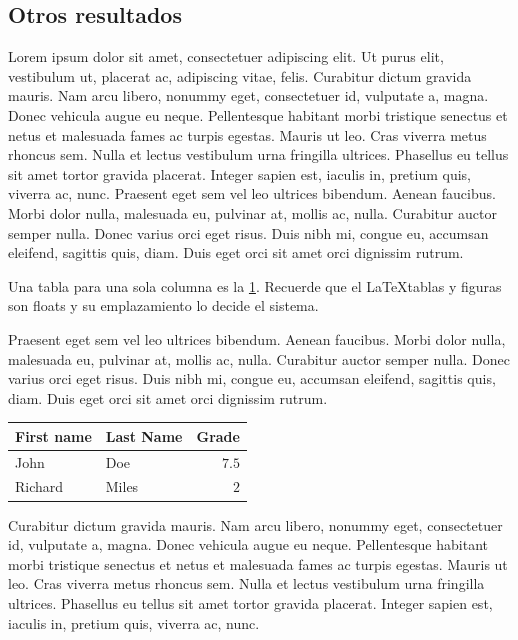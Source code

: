 \documentclass[10pt,twoside]{rcmart} %
\begin{document}
\subsection{Otros resultados}

Lorem ipsum dolor sit amet, consectetuer adipiscing elit. Ut purus elit, vestibulum ut, placerat ac, adipiscing vitae, felis. Curabitur dictum gravida mauris. Nam arcu libero, nonummy eget, consectetuer id, vulputate a, magna. Donec vehicula augue eu neque. Pellentesque habitant morbi tristique senectus et netus et malesuada fames ac turpis egestas. Mauris ut leo. Cras viverra metus rhoncus sem. Nulla et lectus vestibulum urna fringilla ultrices. Phasellus eu tellus sit amet tortor gravida placerat. Integer sapien est, iaculis in, pretium quis, viverra ac, nunc. Praesent eget sem vel leo ultrices bibendum. Aenean faucibus. Morbi dolor nulla, malesuada eu, pulvinar at, mollis ac, nulla. Curabitur auctor semper nulla. Donec varius orci eget risus. Duis nibh mi, congue eu, accumsan eleifend, sagittis quis, diam. Duis eget orci sit amet orci dignissim rutrum.

Una tabla para una sola columna es la \ref{tab:label}. Recuerde que el \LaTeX tablas y figuras son floats y su emplazamiento lo decide el sistema. 

Praesent eget sem vel leo ultrices bibendum. Aenean faucibus. Morbi dolor nulla, malesuada eu, pulvinar at, mollis ac, nulla. Curabitur auctor semper nulla. Donec varius orci eget risus. Duis nibh mi, congue eu, accumsan eleifend, sagittis quis, diam. Duis eget orci sit amet orci dignissim rutrum.

\begin{table}[hbt]
\begin{center}
\begin{tabular}{llr}\hline\hline
First name & Last Name & Grade \\\hline\hline
John & Doe & $7.5$ \\
Richard & Miles & $2$ \\\hline\hline
\end{tabular}
\end{center}
\label{tab:label}
\end{table}

Curabitur dictum gravida mauris. Nam arcu libero, nonummy eget, consectetuer id, vulputate a, magna. Donec vehicula augue eu neque. Pellentesque habitant morbi tristique senectus et netus et malesuada fames ac turpis egestas. Mauris ut leo. Cras viverra metus rhoncus sem. Nulla et lectus vestibulum urna fringilla ultrices. Phasellus eu tellus sit amet tortor gravida placerat. Integer sapien est, iaculis in, pretium quis, viverra ac, nunc.
\end{document}
